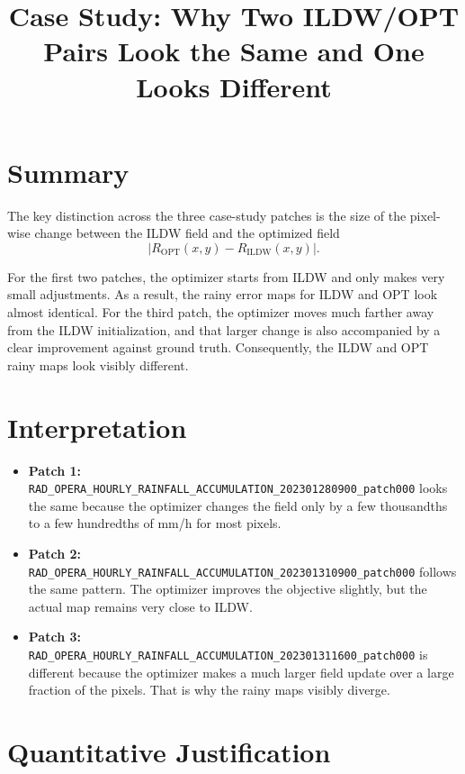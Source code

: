 \documentclass[11pt]{article}
\title{Case Study: Why Two ILDW/OPT Pairs Look the Same and One Looks Different}
\author{}
\date{}
\begin{document}
\maketitle

\section*{Summary}

The key distinction across the three case-study patches is the size of the pixel-wise change between the ILDW field and the optimized field
\[
|R_{\mathrm{OPT}}(x,y) - R_{\mathrm{ILDW}}(x,y)|.
\]

For the first two patches, the optimizer starts from ILDW and only makes very small adjustments. As a result, the rainy error maps for ILDW and OPT look almost identical. For the third patch, the optimizer moves much farther away from the ILDW initialization, and that larger change is also accompanied by a clear improvement against ground truth. Consequently, the ILDW and OPT rainy maps look visibly different.

\section*{Interpretation}

\begin{itemize}[leftmargin=1.5em]
\item \textbf{Patch 1:} \texttt{RAD\_OPERA\_HOURLY\_RAINFALL\_ACCUMULATION\_202301280900\_patch000} looks the same because the optimizer changes the field only by a few thousandths to a few hundredths of mm/h for most pixels.
\item \textbf{Patch 2:} \texttt{RAD\_OPERA\_HOURLY\_RAINFALL\_ACCUMULATION\_202301310900\_patch000} follows the same pattern. The optimizer improves the objective slightly, but the actual map remains very close to ILDW.
\item \textbf{Patch 3:} \texttt{RAD\_OPERA\_HOURLY\_RAINFALL\_ACCUMULATION\_202301311600\_patch000} is different because the optimizer makes a much larger field update over a large fraction of the pixels. That is why the rainy maps visibly diverge.
\end{itemize}

\section*{Quantitative Justification}
\end{document}
